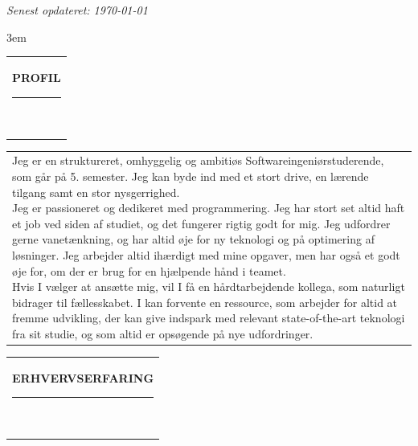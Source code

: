 \documentclass[10pt,A4]{article}
\newcommand{\mpwidth}{\linewidth-\fboxsep-\fboxsep}
\newcommand{\cvtext}[1] {
	\begin{tabular*}{1\mpwidth}{p{1\mpwidth}}
		\parbox{1\mpwidth}{#1}
	\end{tabular*}
}
\newcommand{\cvsection}[1] {
	\vspace{14pt}
	\cvtext{
		\textbf{\huge{\textcolor{darkcol}{\uppercase{#1}}}}\\[-4pt]
		\textcolor{maincol}{ \rule{0.1\textwidth}{2pt} } \\
	}
}
\begin{document}
\begin{paracol}{2}
\begin{rightcolumn}
\textit{Senest opdateret: \today}

\vfill\null
\emergencystretch 3em
\cvsection{PROFIL}

\cvtext{Jeg er en struktureret, omhyggelig og ambitiøs Softwareingeniørstuderende, som går på 5. semester. Jeg kan byde ind med et stort drive, en lærende tilgang samt en stor nysgerrighed.\\

Jeg er passioneret og dedikeret med programmering. Jeg har stort set altid haft et job ved siden af studiet, og det fungerer rigtig godt for mig. Jeg udfordrer gerne vanetænkning, og har altid øje for ny teknologi og på optimering af løsninger. Jeg arbejder altid ihærdigt med mine opgaver, men har også et godt øje for, om der er brug for en hjælpende hånd i teamet.\\

Hvis I vælger at ansætte mig, vil I få en hårdtarbejdende kollega, som naturligt bidrager til fællesskabet. I kan forvente en ressource, som arbejder for altid at fremme udvikling, der kan give indspark med relevant state-of-the-art teknologi fra sit studie, og som altid er opsøgende på nye udfordringer.
}

\vfill\null
\cvsection{ERHVERVSERFARING}


\end{rightcolumn}
\end{paracol}
\end{document}
